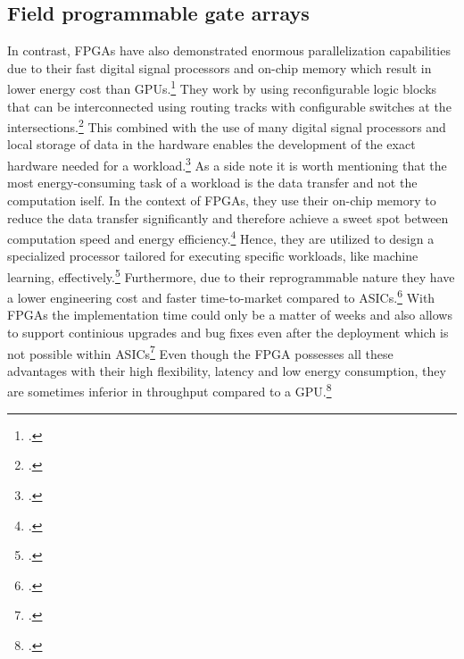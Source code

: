 \subsection{Field programmable gate arrays}
In contrast, \ac{FPGA}s have also demonstrated enormous parallelization capabilities due to their fast digital signal processors and on-chip
memory which result in lower energy cost than GPUs.\footcite[cf.][2693]{ahmadOptimizingHardwareAccelerated2020}
They work by using reconfigurable logic blocks that can be interconnected using routing tracks with configurable switches at the intersections.\footcite[cf.][144]{babuReconfigurableFPGAArchitectures2021}
This combined with the use of many digital signal processors and local storage of data in the hardware enables the development of the exact hardware needed for a workload.\footcite[cf.][19]{baischerLearningHardwareTutorial2021}
As a side note it is worth mentioning that the most energy-consuming task of a workload is the data transfer and not the computation iself.
In the context of \ac{FPGA}s, they use their on-chip memory to reduce the data transfer significantly and therefore achieve a sweet spot between computation speed and energy efficiency.\footcite[cf.][101-102]{huSurveyConvolutionalNeural2022}
Hence, they are utilized to design a specialized processor tailored for executing specific workloads, like machine learning, effectively.\footcite[cf.][322]{sipolaArtificialIntelligenceIoT2022}
Furthermore, due to their reprogrammable nature they have a lower engineering cost and faster time-to-market compared to \ac{ASIC}s.\footcite[cf.][4]{boutrosFPGAArchitecturePrinciples2021}
With \ac{FPGA}s the implementation time could only be a matter of weeks and also allows to support continious upgrades and bug fixes even after the deployment which is not possible within \ac{ASIC}s\footcite[cf.][4]{boutrosFPGAArchitecturePrinciples2021}
Even though the \ac{FPGA} possesses all these advantages with their high flexibility, latency and low energy consumption, they are sometimes inferior in throughput compared to a \ac{GPU}.\footcite[cf.][100]{huSurveyConvolutionalNeural2022}

